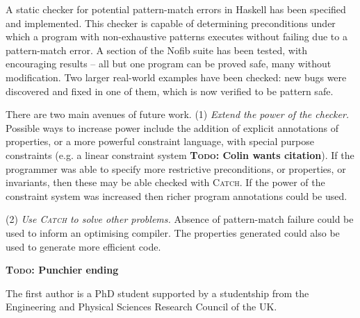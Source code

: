 \documentclass[preprint]{sigplanconf}
\newcommand{\catch}{\textsc{Catch}}
\newcommand{\todo}[1]{\textbf{\textsc{Todo:} #1}}
\begin{document}
A static checker for potential pattern-match errors in Haskell has been specified and implemented. This checker is capable of determining preconditions under which a program with non-exhaustive patterns executes without failing due to a pattern-match error. A section of the Nofib suite has been tested, with encouraging results -- all but one program can be proved safe, many without modification. Two larger real-world examples have been checked: new bugs were discovered and fixed in one of them, which is now verified to be pattern safe.

There are two main avenues of future work. (1) \textit{Extend the power of the checker.} Possible ways to increase power include the addition of explicit annotations of properties, or a more powerful constraint language, with special purpose constraints (e.g. a linear constraint system \todo{Colin wants citation}). If the programmer was able to specify more restrictive preconditions, or properties, or invariants, then these may be able checked with \catch{}. If the power of the constraint system was increased then richer program annotations could be used.

(2) \textit{Use \catch{} to solve other problems.} Absence of pattern-match failure could be used to inform an optimising compiler. The properties generated could also be used to generate more efficient code.

\todo{Punchier ending}


%

\acks

The first author is a PhD student supported by a studentship from the Engineering and Physical Sciences Research Council of the UK.



\end{document}
